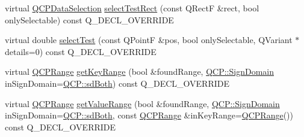 \begin{DoxyCompactItemize}
\item 
virtual \hyperlink{classQCPDataSelection}{Q\+C\+P\+Data\+Selection} \hyperlink{classQCPStatisticalBox_a42febad6ad5e924a151434cc434b4ffc}{select\+Test\+Rect} (const Q\+RectF \&rect, bool only\+Selectable) const Q\+\_\+\+D\+E\+C\+L\+\_\+\+O\+V\+E\+R\+R\+I\+DE
\item 
virtual double \hyperlink{classQCPStatisticalBox_a1607fa92f829c631107c20ccb2d70a6d}{select\+Test} (const Q\+PointF \&pos, bool only\+Selectable, Q\+Variant $\ast$details=0) const Q\+\_\+\+D\+E\+C\+L\+\_\+\+O\+V\+E\+R\+R\+I\+DE
\item 
virtual \hyperlink{classQCPRange}{Q\+C\+P\+Range} \hyperlink{classQCPStatisticalBox_a77d2d13301dfe60c13adfaa17fc1802f}{get\+Key\+Range} (bool \&found\+Range, \hyperlink{namespaceQCP_afd50e7cf431af385614987d8553ff8a9}{Q\+C\+P\+::\+Sign\+Domain} in\+Sign\+Domain=\hyperlink{namespaceQCP_afd50e7cf431af385614987d8553ff8a9aa38352ef02d51ddfa4399d9551566e24}{Q\+C\+P\+::sd\+Both}) const Q\+\_\+\+D\+E\+C\+L\+\_\+\+O\+V\+E\+R\+R\+I\+DE
\item 
virtual \hyperlink{classQCPRange}{Q\+C\+P\+Range} \hyperlink{classQCPStatisticalBox_ab3388a21d0c2e86fbc0cba9c06ceb49b}{get\+Value\+Range} (bool \&found\+Range, \hyperlink{namespaceQCP_afd50e7cf431af385614987d8553ff8a9}{Q\+C\+P\+::\+Sign\+Domain} in\+Sign\+Domain=\hyperlink{namespaceQCP_afd50e7cf431af385614987d8553ff8a9aa38352ef02d51ddfa4399d9551566e24}{Q\+C\+P\+::sd\+Both}, const \hyperlink{classQCPRange}{Q\+C\+P\+Range} \&in\+Key\+Range=\hyperlink{classQCPRange}{Q\+C\+P\+Range}()) const Q\+\_\+\+D\+E\+C\+L\+\_\+\+O\+V\+E\+R\+R\+I\+DE
\end{DoxyCompactItemize}
